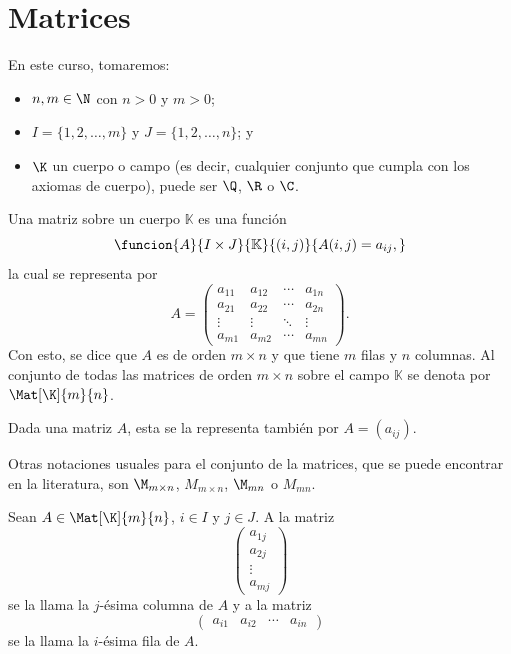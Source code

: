\documentclass[a4,11pt]{aleph-notas}
\begin{document}
\encabezado

\section{Matrices}

En este curso, tomaremos:
\begin{itemize}
    \item
        $n,m\in \N$ con $n>0$ y $m>0$;
    \item 
        $I = \{ 1, 2, \ldots, m\}$ y $J =  \{1, 2 , \ldots, n \}$; y
    \item 
        $\K$ un cuerpo o campo (es decir, cualquier conjunto que cumpla con los axiomas de cuerpo), puede ser $\Q$, $\R$ o $\C$.
\end{itemize}

\begin{defi}[Matriz]
    Una matriz sobre un cuerpo $\mathbb{K}$ es una función 
    \[
        \funcion{A}{I\times J}{\mathbb{K}}
        {(i,j)}{A(i,j)=a_{ij},}
    \]
    la cual se representa por
    \[
        A = 
        \begin{pmatrix}
        a_{11} & a_{12} & \cdots & a_{1n} \\ 
        a_{21} & a_{22} & \cdots & a_{2n} \\ 
        \vdots & \vdots & \ddots & \vdots\\ 
        a_{m1} & a_{m2} & \cdots & a_{mn}
        \end{pmatrix}.
    \]
    Con esto, se dice que $A$ es de orden $m \times n$ y que tiene $m$ filas y $n$ columnas. Al conjunto de todas las matrices de orden $m \times n$ sobre el campo $\mathbb{K}$ se denota por $\Mat[\K]{m}{n}$.
\end{defi}

\begin{advertencia}
    Dada una matriz $A$, esta se la representa también por $A=(a_{ij})$.
\end{advertencia}

\begin{advertencia}
    Otras notaciones usuales para el conjunto de la matrices, que se puede encontrar en la literatura, son $\M_{m\times n}$, $M_{m\times n}$, $\M_{mn}$ o $M_{mn}$.
\end{advertencia}

\begin{defi}
    Sean $A\in\Mat[\K]{m}{n}$, $i\in I$ y $j\in J$. A la matriz
    \[
        \begin{pmatrix}
        a_{1j} \\ 
        a_{2j} \\ 
        \vdots \\ 
        a_{mj} 
        \end{pmatrix}
    \]
    se la llama la $j$-ésima columna de $A$ y a la matriz
    \[
        \begin{pmatrix}
        a_{i1}& a_{i2}&\cdots& a_{in}
        \end{pmatrix}
    \]
    se la llama la $i$-ésima fila de $A$.
\end{defi}
\end{document}
